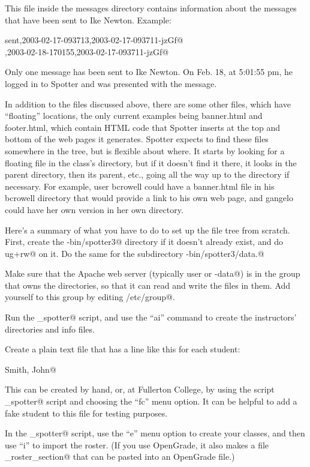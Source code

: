 \documentclass{doc}
\begin{document}
 This file inside the messages directory contains information about
the messages that have been sent to Ike Newton. Example:

\verb@    sent,2003-02-17-093713,2003-02-17-093711-jzGf@\\
\verb@received,2003-02-18-170155,2003-02-17-093711-jzGf@

Only one message has been sent to Ike Newton. On Feb. 18, at 5:01:55 pm, he logged in
to Spotter and was presented with the message.

In addition to the files discussed above, there are some other files, which
have ``floating'' locations, the only current examples being banner.html and footer.html, which contain
HTML code that Spotter inserts at the top and bottom of the web pages it generates. Spotter
expects to find these files somewhere in the tree, but is flexible about where. It starts by looking 
for a floating file in the class's
directory, but if it doesn't find it there, it looks in the parent directory, then its parent, etc., going all the way
up to the \verb@spotter@ directory if necessary. For example, user bcrowell could have a banner.html file
in his bcrowell directory that would provide a link to his own web page, and gangelo could have her
own version in her own directory.

Here's a summary of what you have to do to set up the file tree from scratch.
First, create the \verb@cgi-bin/spotter3@ directory if it doesn't already exist,
and do \verb@chmod ug+rw@ on it. Do the same for the subdirectory
\verb@cgi-bin/spotter3/data.@

Make sure that the Apache web server (typically user \verb@www@ or \verb@www-data@)
is in the group that owns the directories, so that it can read and write the
files in them. Add yourself to this group by editing \verb@/etc/group@.

Run the \verb@admin_spotter@ script, and use the ``ai''
command to create the instructors' directories and info files.

Create
a plain text file that has a line like this for each student:

 Smith, John@

This can be created by hand, or, at Fullerton College, by using the
script \verb@admin_spotter@ script and choosing the ``fc'' menu option.
It can be helpful to add a fake student to this
file for testing purposes.

In the \verb@admin_spotter@ script, use the ``e'' menu option to create
your classes, and then use ``i'' to import the
roster. (If you use OpenGrade, 
it also makes a file \verb@og_roster_section@ that can be pasted into an OpenGrade file.)
\end{document}
